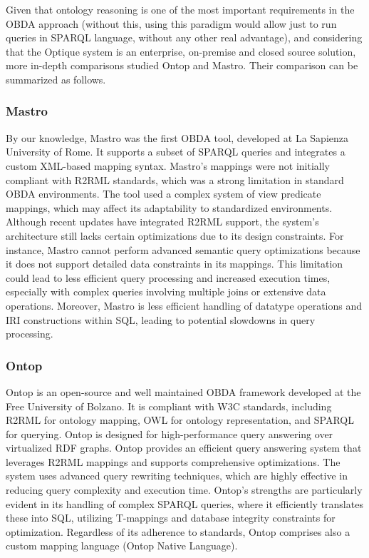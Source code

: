 Given that ontology reasoning is one of the most important requirements in the OBDA approach (without this, using this paradigm would allow just to run queries in SPARQL language, without any other real advantage), and considering that the Optique system is an enterprise, on-premise and closed source solution, more in-depth comparisons \cite{DBLP:conf/dlog/NamiciG18} studied Ontop and Mastro. Their comparison can be summarized as follows.

\subsubsection{Mastro}
By our knowledge, Mastro \cite{DBLP:journals/semweb/CalvaneseGLLPRRRS11} was the first OBDA tool, developed at La Sapienza University of Rome. It supports a subset of SPARQL queries and integrates a custom XML-based mapping syntax.
Mastro's mappings were not initially compliant with R2RML standards, which was a strong limitation in standard OBDA environments. The tool used a complex system of view predicate mappings, which may affect its adaptability to standardized environments. Although recent updates have integrated R2RML support, the system's architecture still lacks certain optimizations due to its design constraints. For instance, Mastro cannot perform advanced semantic query optimizations because it does not support detailed data constraints in its mappings. This limitation could lead to less efficient query processing and increased execution times, especially with complex queries involving multiple joins or extensive data operations.
Moreover, Mastro is less efficient handling of datatype operations and IRI constructions within SQL, leading to potential slowdowns in query processing.

\subsubsection{Ontop}
Ontop \cite{DBLP:conf/sebd/CalvaneseCKKKLR15} is an open-source and well maintained OBDA framework developed at the Free University of Bolzano. It is compliant with W3C standards, including R2RML for ontology mapping, OWL for ontology representation, and SPARQL for querying. Ontop is designed for high-performance query answering over virtualized RDF graphs.
Ontop provides an efficient query answering system that leverages R2RML mappings and supports comprehensive optimizations. The system uses advanced query rewriting techniques, which are highly effective in reducing query complexity and execution time. Ontop's strengths are particularly evident in its handling of complex SPARQL queries, where it efficiently translates these into SQL, utilizing T-mappings and database integrity constraints for optimization.
Regardless of its adherence to standards, Ontop comprises also a custom mapping language (Ontop Native Language).


